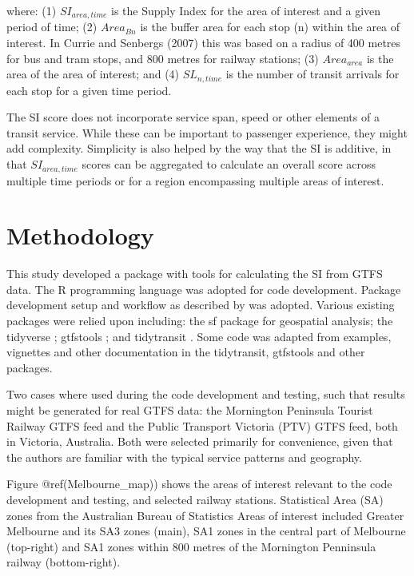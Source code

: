 \documentclass[preprint, 3p,
authoryear]{elsarticle} %
\begin{document}
where: (1) \(SI_{area, time}\) is the Supply Index for the area of
interest and a given period of time; (2) \(Area_{Bn}\) is the buffer
area for each stop (n) within the area of interest. In Currie and
Senbergs (2007) this was based on a radius of 400 metres for bus and
tram stops, and 800 metres for railway stations; (3) \(Area_{area}\) is
the area of the area of interest; and (4) \(SL_{n,time}\) is the number
of transit arrivals for each stop for a given time period.

The SI score does not incorporate service span, speed or other elements
of a transit service. While these can be important to passenger
experience, they might add complexity. Simplicity is also helped by the
way that the SI is additive, in that \(SI_{area, time}\) scores can be
aggregated to calculate an overall score across multiple time periods or
for a region encompassing multiple areas of interest.

\hypertarget{methodology}{%
\section{Methodology}\label{methodology}}

This study developed a package with tools for calculating the SI from
GTFS data. The R programming language \citep{R-base} was adopted for
code development. Package development setup and workflow as described by
\citet{wickham2023r} was adopted. Various existing packages were relied
upon including: the sf package \citep{R-sf} for geospatial analysis; the
tidyverse \citep{tidyverse2019}; gtfstools \citep{R-gtfstools}; and
tidytransit \citep{R-tidytransit}. Some code was adapted from examples,
vignettes and other documentation in the tidytransit, gtfstools and
other packages.

Two cases where used during the code development and testing, such that
results might be generated for real GTFS data: the Mornington Peninsula
Tourist Railway GTFS feed and the Public Transport Victoria (PTV) GTFS
feed, both in Victoria, Australia. Both were selected primarily for
convenience, given that the authors are familiar with the typical
service patterns and geography.

Figure @ref(Melbourne\_map)) shows the areas of interest relevant to the
code development and testing, and selected railway stations. Statistical
Area (SA) zones from the Australian Bureau of Statistics \citep{ABSmaps}
Areas of interest included Greater Melbourne and its SA3 zones (main),
SA1 zones in the central part of Melbourne (top-right) and SA1 zones
within 800 metres of the Mornington Penninsula railway (bottom-right).
\end{document}
